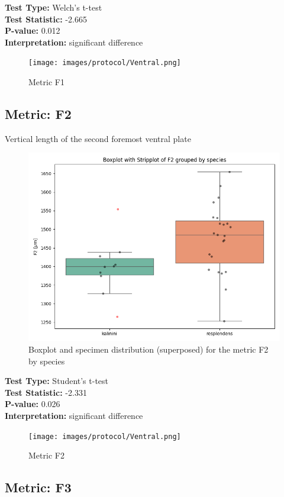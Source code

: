\noindent\textbf{Test Type:} Welch's t-test \\
\noindent\textbf{Test Statistic:} -2.665 \\
\noindent\textbf{P-value:} 0.012 \\
\noindent\textbf{Interpretation:} significant difference

\begin{figure}[H]
\centering
\texttt{[image: images/protocol/Ventral.png]}
\caption{ Metric F1}
\end{figure}

\newpage
\subsection*{Metric: F2}

Vertical length of the second foremost ventral plate

\begin{figure}[H]
\centering
\includegraphics[width=0.7\linewidth]{images/boxplot/boxplot_F2.png}
\caption{  Boxplot and specimen distribution (superposed) for the metric  F2 by species}
\end{figure}

\noindent\textbf{Test Type:} Student's t-test \\
\noindent\textbf{Test Statistic:} -2.331 \\
\noindent\textbf{P-value:} 0.026 \\
\noindent\textbf{Interpretation:} significant difference

\begin{figure}[H]
\centering
\texttt{[image: images/protocol/Ventral.png]}
\caption{ Metric F2}
\end{figure}

\newpage
\subsection*{Metric: F3}

